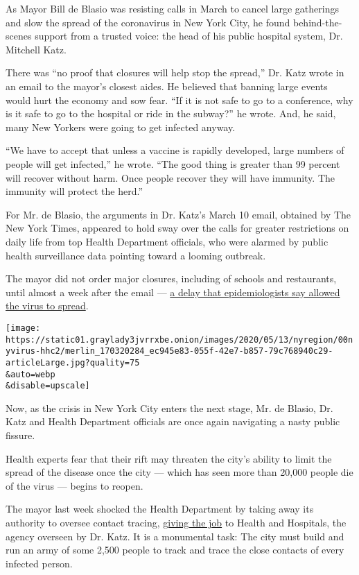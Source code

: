 As Mayor Bill de Blasio was resisting calls in March to cancel large
gatherings and slow the spread of the coronavirus in New York City, he
found behind-the-scenes support from a trusted voice: the head of his
public hospital system, Dr. Mitchell Katz.

There was ``no proof that closures will help stop the spread,'' Dr. Katz
wrote in an email to the mayor's closest aides. He believed that banning
large events would hurt the economy and sow fear. ``If it is not safe to
go to a conference, why is it safe to go to the hospital or ride in the
subway?'' he wrote. And, he said, many New Yorkers were going to get
infected anyway.

``We have to accept that unless a vaccine is rapidly developed, large
numbers of people will get infected,'' he wrote. ``The good thing is
greater than 99 percent will recover without harm. Once people recover
they will have immunity. The immunity will protect the herd.''

For Mr. de Blasio, the arguments in Dr. Katz's March 10 email, obtained
by The New York Times, appeared to hold sway over the calls for greater
restrictions on daily life from top Health Department officials, who
were alarmed by public health surveillance data pointing toward a
looming outbreak.

The mayor did not order major closures, including of schools and
restaurants, until almost a week after the email ---
\href{https://www.nytimes3xbfgragh.onion/2020/04/08/nyregion/new-york-coronavirus-response-delays.html}{a
delay that epidemiologists say allowed the virus to spread}.

\texttt{[image: https://static01.graylady3jvrrxbe.onion/images/2020/05/13/nyregion/00nyvirus-hhc2/merlin\_170320284\_ec945e83-055f-42e7-b857-79c768940c29-articleLarge.jpg?quality=75\\\&auto=webp\\\&disable=upscale]}

Now, as the crisis in New York City enters the next stage, Mr. de
Blasio, Dr. Katz and Health Department officials are once again
navigating a nasty public fissure.

Health experts fear that their rift may threaten the city's ability to
limit the spread of the disease once the city --- which has seen more
than 20,000 people die of the virus --- begins to reopen.

The mayor last week shocked the Health Department by taking away its
authority to oversee contact tracing,
\href{https://www.nytimes3xbfgragh.onion/2020/05/07/nyregion/coronavirus-contact-tracing-nyc.html}{giving
the job} to Health and Hospitals, the agency overseen by Dr. Katz. It is
a monumental task: The city must build and run an army of some 2,500
people to track and trace the close contacts of every infected person.

